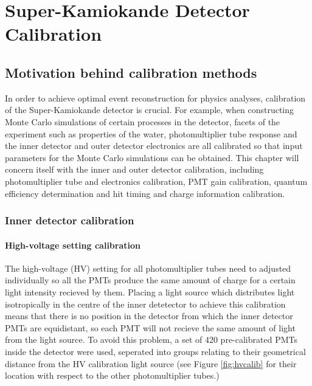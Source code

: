 \chapter{Super-Kamiokande Detector Calibration}
\label{chp:superkcalib}

\section{Motivation behind calibration methods}
In order to achieve optimal event reconstruction for physics analyses, calibration of the Super-Kamiokande detector is crucial. For example, when constructing Monte Carlo simulations of certain processes in the detector, facets of the experiment such as properties of the water, photomultiplier tube response and the inner detector and outer detector electronics are all calibrated so that input parameters for the Monte Carlo simulations can be obtained. This chapter will concern itself with the inner and outer detector calibration, including photomultiplier tube and electronics calibration, PMT gain calibration, quantum efficiency determination and hit timing and charge information calibration. 

\subsection{Inner detector calibration}



\subsubsection{High-voltage setting calibration}

The high-voltage (HV) setting for all photomultiplier tubes need to adjusted individually so all the PMTs produce the same amount of charge for a certain light intensity recieved by them. Placing a light source which distributes light isotropically in the centre of the inner detetector to achieve this calibration means that there is no position in the detector from which the inner detector PMTs are equidistant, so each PMT will not recieve the same amount of light from the light source. To avoid this problem, a set of 420 pre-calibrated PMTs inside the detector were used, seperated into groups relating to their geometrical distance from the HV calibration light source (see Figure \ref{fig:hvcalib} for their location with respect to the other photomultiplier tubes.)

